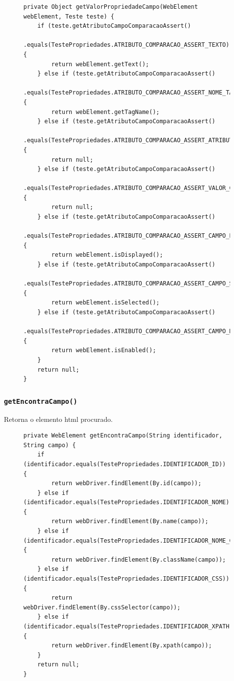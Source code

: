 \documentclass[tg]{mdtufsm}
\begin{document}
\begin{figure}[!htb]
\begin{lstlisting}
private Object getValorPropriedadeCampo(WebElement webElement, Teste teste) {
	if (teste.getAtributoCampoComparacaoAssert()
		.equals(TestePropriedades.ATRIBUTO_COMPARACAO_ASSERT_TEXTO)) {
        return webElement.getText();
    } else if (teste.getAtributoCampoComparacaoAssert()
    		.equals(TestePropriedades.ATRIBUTO_COMPARACAO_ASSERT_NOME_TAG)) {
        return webElement.getTagName();
    } else if (teste.getAtributoCampoComparacaoAssert()
    		.equals(TestePropriedades.ATRIBUTO_COMPARACAO_ASSERT_ATRIBUTO)) {
        return null;
    } else if (teste.getAtributoCampoComparacaoAssert()
    		.equals(TestePropriedades.ATRIBUTO_COMPARACAO_ASSERT_VALOR_CSS)) {
        return null;
    } else if (teste.getAtributoCampoComparacaoAssert()
    		.equals(TestePropriedades.ATRIBUTO_COMPARACAO_ASSERT_CAMPO_EXIBIDO)) {
        return webElement.isDisplayed();
    } else if (teste.getAtributoCampoComparacaoAssert()
    		.equals(TestePropriedades.ATRIBUTO_COMPARACAO_ASSERT_CAMPO_SELECIONADO)) {
        return webElement.isSelected();
    } else if (teste.getAtributoCampoComparacaoAssert()
    		.equals(TestePropriedades.ATRIBUTO_COMPARACAO_ASSERT_CAMPO_HABILITADO)) {
        return webElement.isEnabled();
    }
    return null;
}
\end{lstlisting}
	\label{code:getValorpropriedadeCampo}
\end{figure}

\subsubsection{\texttt{getEncontraCampo()}}
Retorna o elemento html procurado.

\begin{figure}[!htb]
\begin{lstlisting}
private WebElement getEncontraCampo(String identificador, String campo) {
	if (identificador.equals(TestePropriedades.IDENTIFICADOR_ID)) {
		return webDriver.findElement(By.id(campo));
    } else if (identificador.equals(TestePropriedades.IDENTIFICADOR_NOME)) {
        return webDriver.findElement(By.name(campo));
    } else if (identificador.equals(TestePropriedades.IDENTIFICADOR_NOME_CLASSE)) {
        return webDriver.findElement(By.className(campo));
    } else if (identificador.equals(TestePropriedades.IDENTIFICADOR_CSS)) {
        return webDriver.findElement(By.cssSelector(campo));
    } else if (identificador.equals(TestePropriedades.IDENTIFICADOR_XPATH)) {
        return webDriver.findElement(By.xpath(campo));
    }
    return null;    
}
\end{lstlisting}
	\label{code:getEncontraCampo}
\end{figure}
\end{document}
